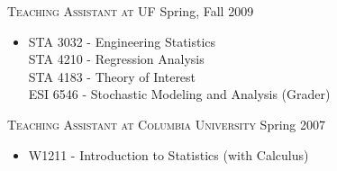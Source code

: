 \documentclass[10pt]{article}
\newenvironment{innerlist}[1][\enskip\textbullet]%
        {\begin{itemize}[#1,leftmargin=*,parsep=0pt,itemsep=0pt,topsep=0pt,partopsep=0pt]}
        {\end{itemize}}
\begin{document}
\textsc{Teaching Assistant at UF} \hfill {Spring, Fall 2009}
\begin{innerlist}

\item[] STA 3032 - Engineering Statistics\\
        STA 4210 - Regression Analysis\\
        STA 4183 - Theory of Interest\\
        ESI 6546 - Stochastic Modeling and Analysis (Grader)\\
\end{innerlist}

\textsc{Teaching Assistant at Columbia University} \hfill {Spring 2007}
\begin{innerlist}

\item[] W1211 - Introduction to Statistics (with Calculus)
\end{innerlist}
\end{document}
